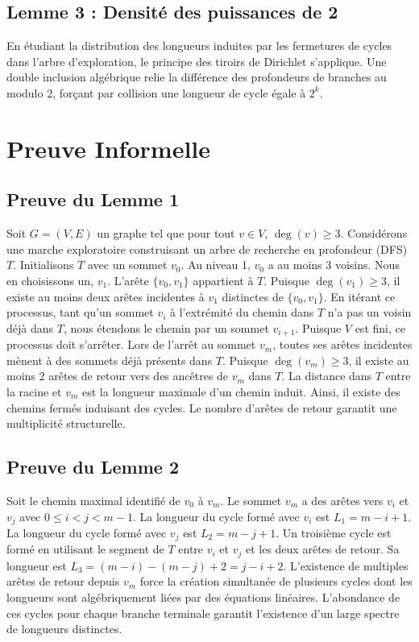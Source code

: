 \documentclass[12pt,a4paper]{article}
\begin{document}
\subsection{Lemme 3 : Densit\'e des puissances de 2}
En \'etudiant la distribution des longueurs induites par les fermetures de cycles dans l'arbre d'exploration, le principe des tiroirs de Dirichlet s'applique. Une double inclusion alg\'ebrique relie la diff\'erence des profondeurs de branches au modulo 2, for\c{c}ant par collision une longueur de cycle \'egale \`a $2^k$.

\section{Preuve Informelle}

\subsection{Preuve du Lemme 1}
Soit $G = (V,E)$ un graphe tel que pour tout $v \in V$, $\deg(v) \geq 3$.
Consid\'erons une marche exploratoire construisant un arbre de recherche en profondeur (DFS) $T$.
Initialisons $T$ avec un sommet $v_0$.
Au niveau 1, $v_0$ a au moins 3 voisins. Nous en choisissons un, $v_1$. L'ar\^ete $\{v_0, v_1\}$ appartient \`a $T$.
Puisque $\deg(v_1) \geq 3$, il existe au moins deux ar\^etes incidentes \`a $v_1$ distinctes de $\{v_0, v_1\}$.
En it\'erant ce processus, tant qu'un sommet $v_i$ \`a l'extr\'emit\'e du chemin dans $T$ n'a pas un voisin d\'ej\`a dans $T$, nous \'etendons le chemin par un sommet $v_{i+1}$.
Puisque $V$ est fini, ce processus doit s'arr\^eter. Lors de l'arr\^et au sommet $v_m$, toutes ses ar\^etes incidentes m\`enent \`a des sommets d\'ej\`a pr\'esents dans $T$.
Puisque $\deg(v_m) \geq 3$, il existe au moins 2 ar\^etes de retour vers des anc\^etres de $v_m$ dans $T$.
La distance dans $T$ entre la racine et $v_m$ est la longueur maximale d'un chemin induit. Ainsi, il existe des chemins ferm\'es induisant des cycles. Le nombre d'ar\^etes de retour garantit une multiplicit\'e structurelle.

\subsection{Preuve du Lemme 2}
Soit le chemin maximal identifi\'e de $v_0$ \`a $v_m$.
Le sommet $v_m$ a des ar\^etes vers $v_i$ et $v_j$ avec $0 \leq i < j < m-1$.
La longueur du cycle form\'e avec $v_i$ est $L_1 = m - i + 1$.
La longueur du cycle form\'e avec $v_j$ est $L_2 = m - j + 1$.
Un troisi\`eme cycle est form\'e en utilisant le segment de $T$ entre $v_i$ et $v_j$ et les deux ar\^etes de retour. Sa longueur est $L_3 = (m - i) - (m - j) + 2 = j - i + 2$.
L'existence de multiples ar\^etes de retour depuis $v_m$ force la cr\'eation simultan\'ee de plusieurs cycles dont les longueurs sont alg\'ebriquement li\'ees par des \'equations lin\'eaires. L'abondance de ces cycles pour chaque branche terminale garantit l'existence d'un large spectre de longueurs distinctes.
\end{document}
